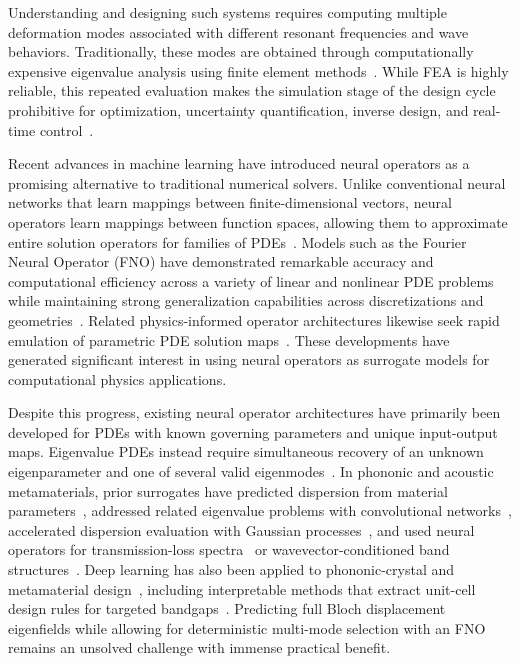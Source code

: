\documentclass[preprint,review,12pt,numafflabel]{elsarticle}
\begin{document}
Understanding and designing such systems requires computing multiple deformation modes associated with different resonant frequencies and wave behaviors. Traditionally, these modes are obtained through computationally expensive eigenvalue analysis using finite element methods~\cite{Zhang2024uq}. While FEA is highly reliable, this repeated evaluation makes the simulation stage of the design cycle prohibitive for optimization, uncertainty quantification, inverse design, and real-time control~\cite{Zhang2024uq,hussein2014dynamics}.

Recent advances in machine learning have introduced neural operators as a promising alternative to traditional numerical solvers. Unlike conventional neural networks that learn mappings between finite-dimensional vectors, neural operators learn mappings between function spaces, allowing them to approximate entire solution operators for families of PDEs~\cite{kovachki2023neural,lu2021deeponet}. Models such as the Fourier Neural Operator (FNO) have demonstrated remarkable accuracy and computational efficiency across a variety of linear and nonlinear PDE problems while maintaining strong generalization capabilities across discretizations and geometries~\cite{li2021fno}. Related physics-informed operator architectures likewise seek rapid emulation of parametric PDE solution maps~\cite{wang2021pidon}. These developments have generated significant interest in using neural operators as surrogate models for computational physics applications.

Despite this progress, existing neural operator architectures have primarily been developed for PDEs with known governing parameters and unique input-output maps. Eigenvalue PDEs instead require simultaneous recovery of an unknown eigenparameter and one of several valid eigenmodes~\cite{finol2019eigenvalue,hussein2014dynamics}. In phononic and acoustic metamaterials, prior surrogates have predicted dispersion from material parameters~\cite{liu2019dispersion}, addressed related eigenvalue problems with convolutional networks~\cite{finol2019eigenvalue}, accelerated dispersion evaluation with Gaussian processes~\cite{Ogren2024gpr}, and used neural operators for transmission-loss spectra~\cite{wagner2024neural} or wavevector-conditioned band structures~\cite{liu2026hybridfno}. Deep learning has also been applied to phononic-crystal and metamaterial design~\cite{liu2023deeplearning,jin2022intelligent,muhammad2022ml}, including interpretable methods that extract unit-cell design rules for targeted bandgaps~\cite{CHEN2022101895,Bastawrous2025}. Predicting full Bloch displacement eigenfields while allowing for deterministic multi-mode selection with an FNO remains an unsolved challenge with immense practical benefit.
\end{document}
